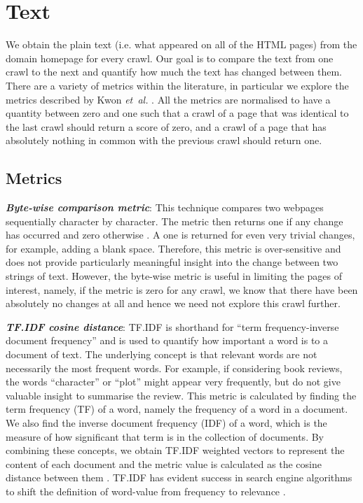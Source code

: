 \documentclass[10pt, a4paper]{article}
\begin{document}
\section{Text}
\label{sec:text}
\vspace{-2mm}
 We obtain the plain text (i.e. what appeared on all of the HTML pages) from the domain homepage for every crawl.
 Our goal is to compare the text from one crawl to the next and quantify how much the text has changed between them.
 There are a variety of metrics within the literature, in particular we explore the metrics described by Kwon \textit{et~al.}
 \cite{kwon2006precise}.
 All the metrics are normalised to have a quantity between zero and one such that a crawl of a page that was identical to the last crawl should return a score of zero, and a crawl of a page that has absolutely nothing in common with the previous crawl should return one.
\vspace{-2mm}
\subsection{Metrics}
\vspace{-2mm}
\textit{\textbf{Byte-wise comparison metric}}:
 This technique compares two webpages sequentially character by character.
 The metric then returns one if any change has occurred and zero otherwise \cite{brewington2000dynamic, cho1999evolution,kim2005empirical}.
 A one is returned for even very trivial changes, for example, adding a blank space.
 Therefore, this metric is over-sensitive and does not provide particularly meaningful insight into the change between two strings of text.
 However, the byte-wise metric is useful in limiting the pages of interest, namely, if the metric is zero for any crawl, we know that there have been absolutely no changes at all and hence we need not explore this crawl further.
\vspace{1.5mm}

\noindent \textit{\textbf{TF.IDF cosine distance}}:
 TF.IDF is shorthand for ``term frequency-inverse document frequency'' and is used to quantify how important a word is to a document of text.
 The underlying concept is that relevant words are not necessarily the most frequent words.
 For example, if considering book reviews, the words ``character'' or ``plot'' might appear very frequently, but do not give valuable insight to summarise the review.
 This metric is calculated by finding the term frequency (TF) of a word, namely the frequency of a word in a document.
 We also find the inverse document frequency (IDF) of a word, which is the measure of how significant that term is in the collection of documents.
 By combining these concepts, we obtain TF.IDF weighted vectors to represent the content of each document and the metric value is calculated as the cosine distance between them \cite{salton1986introduction}.
 TF.IDF has evident success in search engine algorithms to shift the definition of word-value from frequency to relevance \cite{beel2016paper}.
\end{document}
